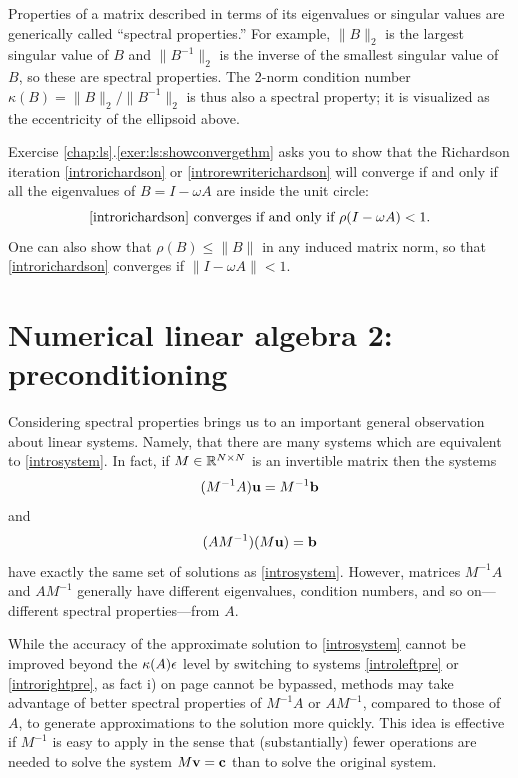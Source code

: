 Properties of a matrix described in terms of its eigenvalues or singular values are generically called ``spectral properties.''  For example, $\|B\|_2$ is the largest singular value of $B$ and $\|B^{-1}\|_2$ is the inverse of the smallest singular value of $B$, so these are spectral properties.  The 2-norm condition number $\kappa(B)=\|B\|_2/\|B^{-1}\|_2$ is thus also a spectral property; it is visualized as the eccentricity of the ellipsoid above.

Exercise \ref{chap:ls}.\ref{exer:ls:showconvergethm} asks you to show that the Richardson iteration \eqref{introrichardson} or \eqref{introrewriterichardson} will converge if and only if all the eigenvalues of $B=I-\omega A$ are inside the unit circle:
\begin{equation}
\text{\eqref{introrichardson} converges if and only if } \rho(I-\omega A) < 1. \label{introconvergethm}
\end{equation}
One can also show that $\rho(B) \le \|B\|$ in any induced matrix norm, so that \eqref{introrichardson} converges if $\|I-\omega A\| < 1$.


\section{Numerical linear algebra 2: preconditioning}

Considering spectral properties brings us to an important general observation about linear systems.  Namely, that there are many systems which are equivalent to \eqref{introsystem}.  In fact, if $M\in\mathbb{R}^{N\times N}$ is an invertible matrix then the systems
\begin{equation}
(M^{-1} A) \mathbf{u} = M^{-1} \mathbf{b} \label{introleftpre}
\end{equation}
and
\begin{equation}
(A M^{-1}) (M\mathbf{u}) = \mathbf{b} \label{introrightpre}
\end{equation}
have exactly the same set of solutions as \eqref{introsystem}.  However, matrices $M^{-1} A$ and $A M^{-1}$ generally have different eigenvalues, condition numbers, and so on---different spectral properties---from $A$.

While the accuracy of the approximate solution to \eqref{introsystem} cannot be improved beyond the $\kappa(A) \epsilon$ level by switching to systems \eqref{introleftpre} or \eqref{introrightpre}, as fact i) on page \pageref{limittoaccuracy} cannot be bypassed, methods may take advantage of better spectral properties of $M^{-1} A$ or $A M^{-1}$, compared to those of $A$, to generate approximations to the solution more quickly.  This idea is effective if $M^{-1}$ is easy to apply in the sense that (substantially) fewer operations are needed to solve the system $M\mathbf{v}=\mathbf{c}$ than to solve the original system.

